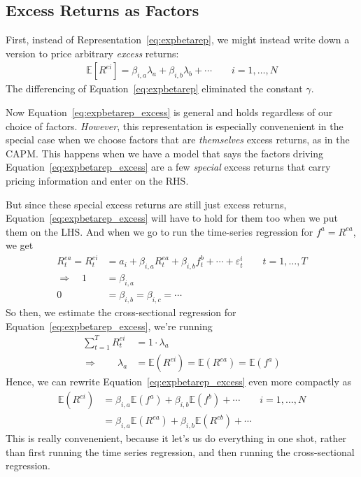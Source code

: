 \documentclass[12pt]{article}
\theoremstyle{plain}
\theoremstyle{definition}
\theoremstyle{remark}
\begin{document}
\subsection{Excess Returns as Factors}

First, instead of Representation~\ref{eq:expbetarep}, we might instead
write down a version to price arbitrary \emph{excess} returns:
\begin{align}
  \mathbb{E}[R^{ei}]
  = \beta_{i,a}\lambda_a + \beta_{i,b} \lambda_b + \cdots
  \qquad i = 1,\ldots,N
  \label{eq:expbetarep_excess}
\end{align}
The differencing of Equation~\ref{eq:expbetarep} eliminated the constant
$\gamma$.

Now Equation~\ref{eq:expbetarep_excess} is general and holds regardless
of our choice of factors. \emph{However}, this representation is
especially convenenient in the special case when we choose factors that are
\emph{themselves} excess returns, as in the CAPM.  This happens when we
have a model that says the factors driving
Equation~\ref{eq:expbetarep_excess} are a few \emph{special} excess
returns that carry pricing information and enter on the RHS.

But since these special excess returns are still just excess returns,
Equation~\ref{eq:expbetarep_excess} will have to hold for them too when
we put them on the LHS. And when we go to run the time-series
regression for $f^a = R^{ea}$, we get
\begin{align*}
  R_t^{ea} = R^{ei}_t
  &= a_i + \beta_{i,a} R_t^{ea} + \beta_{i,b} f_t^b + \cdots
  + \varepsilon^i_t
  \qquad t = 1,\ldots,T\\
  \Rightarrow\quad
  1 &= \beta_{i,a} \\
  0 &= \beta_{i,b} = \beta_{i,c} =\cdots
\end{align*}
So then, we estimate the cross-sectional regression for
Equation~\ref{eq:expbetarep_excess}, we're running
\begin{align*}
  \sum^T_{t=1} R^{ei}_t &= 1 \cdot \lambda_a \\
  \Rightarrow\qquad
  \lambda_a &= \mathbb{E}(R^{ei}) = \mathbb{E}(R^{ea})
   = \mathbb{E}(f^{a})
\end{align*}
Hence, we can rewrite Equation~\ref{eq:expbetarep_excess} even more
compactly as
\begin{align*}
  \mathbb{E}(R^{ei})
  &=
  \beta_{i,a}\mathbb{E}(f^a) +
  \beta_{i,b}\mathbb{E}(f^b) +
  \cdots
  \qquad i = 1,\ldots,N \\
  &=
  \beta_{i,a}\mathbb{E}(R^{ea}) +
  \beta_{i,b}\mathbb{E}(R^{eb}) +
  \cdots
\end{align*}
This is really convenenient, because it let's us do everything in one
shot, rather than first running the time series regression, and then
running the cross-sectional regression.
\end{document}
